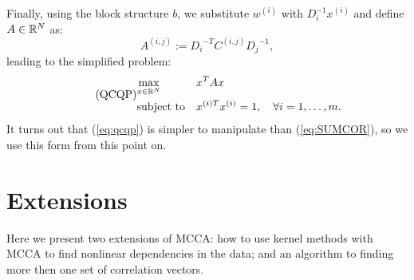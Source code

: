 Finally, using the block structure $b$, we substitute $w^{(i)}$ with $D_i^{-1} x^{(i)}$ and define $A \in \mathbb{R}^N$ as:
\begin{equation*}
A^{(i,j)} := {D_i}^{-T} C^{(i,j)} {D_j}^{-1},
\end{equation*}
leading to the simplified problem:
 \begin{equation}\label{eq:qcqp}
\tag{QCQP}
\begin{aligned}
& \underset{x \in \mathbb{R}^{N}}{\text{max}}
& & x^T A x\\
& \text{subject to}
& &x^{(i)T} x^{(i)} = 1, \quad\forall i = 1, \ldots, m.
\end{aligned}
\end{equation}
It turns out that (\ref{eq:qcqp}) is simpler to  manipulate than  (\ref{eq:SUMCOR}), so we use this form from this point on.





\vspace{-0.1cm}
\section{Extensions}\label{sec:sumcorextensions}
Here we present two extensions of MCCA: how to use kernel methods with
MCCA to find nonlinear dependencies in the data; and an
algorithm to finding more then one set of correlation vectors.
